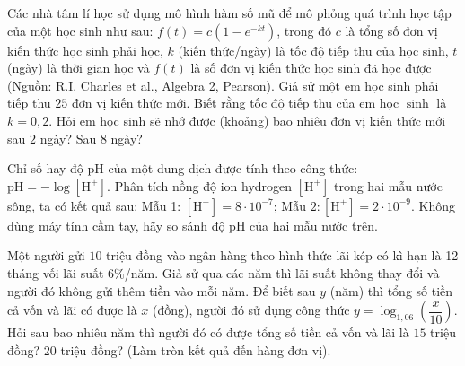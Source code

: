 \begin{bt}%
	Các nhà tâm lí học sử dụng mô hình hàm số mũ để mô phỏng quá trình học tập của một học sinh như sau: $f(t)=c\left(1-e^{-k t}\right)$, trong đó $c$ là tổng số đơn vị kiến thức học sinh phải học, $k$ (kiến thức/ngày) là tốc độ tiếp thu của học sinh, $t$ (ngày) là thời gian học và $f(t)$ là số đơn vị kiến thức học sinh đã học được (Nguồn: R.I. Charles et al., Algebra 2, Pearson). Giả sử một em học sinh phải tiếp thu $25$ đơn vị kiến thức mới. Biết rằng tốc độ tiếp thu của em học $\sinh$ là $k=0{,}2$. Hỏi em học sinh sẽ nhớ được (khoảng) bao nhiêu đơn vị kiến thức mới sau $2$ ngày? Sau $8$ ngày?
\end{bt}

\begin{bt}%
	Chỉ số hay độ pH của một dung dịch được tính theo công thức: $\mathrm{pH}=-\log \left[\mathrm{H}^{+}\right]$. Phân tích nồng độ ion hydrogen $\left[\mathrm{H}^{+}\right]$ trong hai mẫu nước sông, ta có kết quả sau: Mẫu 1: $\left[\mathrm{H}^{+}\right]=8 \cdot 10^{-7}$; Mẫu $2:\left[\mathrm{H}^{+}\right]=2 \cdot 10^{-9}$.
	Không dùng máy tính cầm tay, hãy so sánh độ pH của hai mẫu nước trên.
\end{bt}

\begin{bt}%
	Một người gửi $10$ triệu đồng vào ngân hàng theo hình thức lãi kép có kì hạn là 12 tháng vối lãi suất $6\%$/năm. Giả sử qua các năm thì lãi suất không thay đổi và người đó không gửi thêm tiền vào mỗi năm. Để biết sau $y$ (năm) thì tổng số tiền cả vốn và lãi có được là $x$ (đồng), người đó sử dụng công thức $y=\log_{1,06}\left(\dfrac{x}{10}\right)$. Hỏi sau bao nhiêu năm thì người đó có được tổng số tiền cả vốn và lãi là $15$ triệu đồng? $20$ triệu đồng? (Làm tròn kết quả đến hàng đơn vị).
\end{bt}

